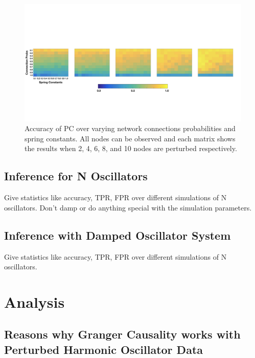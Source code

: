 \documentclass[]{article}
\begin{document}
\begin{figure}
    \centering
    \includegraphics[width=15cm]{VaryStrengthsProbs.jpeg}
    \caption{Accuracy of PC over varying network connections probabilities and spring constants. All nodes can be observed and each matrix shows the results when 2, 4, 6, 8, and 10 nodes are perturbed respectively.}
    \label{fig:example}
\end{figure}

\subsection{Inference for N Oscillators}
Give statistics like accuracy, TPR, FPR over different simulations of N oscillators. Don't damp or do anything special with the simulation parameters.

\subsection{Inference with Damped Oscillator System}
Give statistics like accuracy, TPR, FPR over different simulations of N oscillators.


\section{Analysis}
\subsection{Reasons why Granger Causality works with Perturbed Harmonic Oscillator Data}
\end{document}
